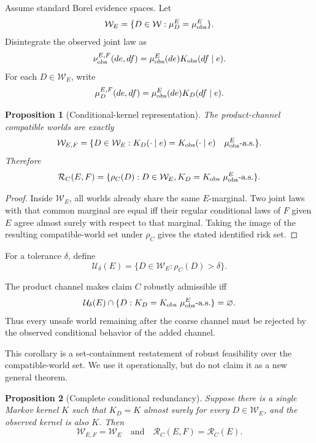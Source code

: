 \documentclass[11pt]{article}
\newtheorem{proposition}{Proposition}
\begin{document}
Assume standard Borel evidence spaces. Let
\[
\mathcal W_E
=
\{D\in\mathcal W:\mu_D^E=\mu_{\rm obs}^E\}.
\]
Disintegrate the observed joint law as
\[
\nu_{\rm obs}^{E,F}(de,df)
=
\mu_{\rm obs}^E(de)K_{\rm obs}(df\mid e).
\]
For each $D\in\mathcal W_E$, write
\[
\mu_D^{E,F}(de,df)
=
\mu_{\rm obs}^E(de)K_D(df\mid e).
\]

\begin{proposition}[Conditional-kernel representation]
The product-channel compatible worlds are exactly
\[
\mathcal W_{E,F}
=
\{D\in\mathcal W_E:
K_D(\cdot\mid e)=K_{\rm obs}(\cdot\mid e)
\quad \mu_{\rm obs}^E\text{-a.s.}\}.
\]
Therefore
\[
\mathcal R_C(E,F)
=
\{\rho_C(D):
D\in\mathcal W_E,K_D=K_{\rm obs}\ \mu_{\rm obs}^E\text{-a.s.}\}.
\]
\end{proposition}

\begin{proof}
Inside $\mathcal W_E$, all worlds already share the same $E$-marginal.
Two joint laws with that common marginal are equal iff their regular
conditional laws of $F$ given $E$ agree almost surely with respect to that
marginal. Taking the image of the resulting compatible-world set under
$\rho_C$ gives the stated identified risk set.
\end{proof}

For a tolerance $\delta$, define
\[
\mathcal U_\delta(E)
=
\{D\in\mathcal W_E:\rho_C(D)>\delta\}.
\]

\begin{corollary}
The product channel makes claim $C$ robustly admissible iff
\[
\mathcal U_\delta(E)
\cap
\{D:K_D=K_{\rm obs}\ \mu_{\rm obs}^{E}\text{-a.s.}\}
=
\varnothing.
\]
Thus every unsafe world remaining after the coarse channel must be rejected
by the observed conditional behavior of the added channel.
\end{corollary}

This corollary is a set-containment restatement of robust feasibility over the
compatible-world set. We use it operationally, but do not claim it as a new
general theorem.

\begin{proposition}[Complete conditional redundancy]
Suppose there is a single Markov kernel $K$ such that
$K_D=K$ almost surely for every $D\in\mathcal W_E$, and the observed kernel
is also $K$. Then
\[
\mathcal W_{E,F}=\mathcal W_E
\quad\text{and}\quad
\mathcal R_C(E,F)=\mathcal R_C(E).
\]
\end{proposition}
\end{document}
